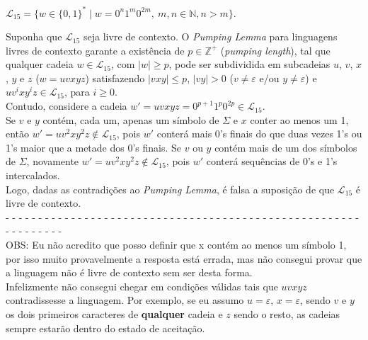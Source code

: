 \documentclass[12pt]{article}
\def\discente{Iury Alexandre Alves Bo}
\def\matricula{202103735}
\def\myling{{15}} %
\newcommand{\ve}{\ensuremath{\varepsilon}}
\begin{document}
%
\begin{tcolorbox}[rounded corners, colback=yellow!5, colframe=red!40!black, title={\discente\ (\matricula)}]
 $\mathcal{L}_{\myling} = \{w\in\{0,1\}^*\mid w = 0^n1^m0^{2m},\ m,n \in \mathbb{N}, n > m\}$.
\end{tcolorbox}
\begin{tcolorbox}[rounded corners, breakable, colback=yellow!5, colframe=red!40!black, title={A linguagem $\mathcal{L}_{\myling}$ não é livre de contexto.}]
Suponha que $\mathcal{L}_{\myling}$ seja livre de contexto. O \emph{Pumping Lemma} para linguagens livres de contexto garante a existência de $p\in\mathbb{Z}^+$ (\emph{pumping length}), tal que qualquer cadeia $w\in \mathcal{L}_{\myling}$, com $|w|\geqslant p$, pode ser subdividida em subcadeias $u$, $v$, $x$, $y$ e $z$ ($w=uvxyz$) satisfazendo $|vxy|\leqslant p$, $|vy|>0$ ($v\neq\varepsilon$ e/ou $y\neq\varepsilon$) e $uv^ixy^iz\in \mathcal{L}_{\myling}$, para $i\geqslant 0$.\\[10pt]
Contudo, considere a cadeia $w'=uvxyz=0^{p+1}1^p0^{2p}\in \mathcal{L}_{\myling}$. \\[10pt]
Se $v$ e $y$ contém, cada um, apenas um símbolo de $\Sigma$ e $x$ conter ao menos um 1, então $w'=uv^2xy^2z\notin \mathcal{L}_{\myling}$, pois $w'$ conterá mais 0's finais do que duas vezes 1's ou 1's maior que a metade dos 0's finais. Se $v$ ou $y$ contém mais de um dos símbolos de $\Sigma$, novamente $w'=uv^2xy^2z\notin \mathcal{L}_{\myling}$, pois $w'$ conterá sequências de 0's e 1's intercalados.\\[10pt]
 Logo, dadas as contradições ao \emph{Pumping Lemma}, é falsa a suposição de que $\mathcal{L}_{\myling}$ é livre de contexto.\\[10pt]
 - - - - - - - - - - - - - - - - - - - - - - - - - - - - - - - - - - - - - - - - - - - - - - - - - - - - - - - - - - - - - - -\\[10pt]
 OBS: Eu não acredito que posso definir que x contém ao menos um símbolo 1, por isso muito provavelmente a resposta está errada, mas não consegui provar que a linguagem não é livre de contexto sem ser desta forma. \\[10pt]
 Infelizmente não consegui chegar em condições válidas tais que $uvxyz$ contradissesse a linguagem. Por exemplo, se eu assumo $u=\ve$, $x=\ve$, sendo $v$ e $y$ os dois primeiros caracteres de \textbf{qualquer} cadeia e $z$ sendo o resto, as cadeias sempre estarão dentro do estado de aceitação.\\[10pt]

\end{tcolorbox}
\end{document}
